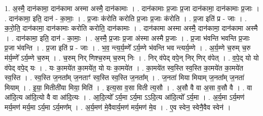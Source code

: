 \documentclass[17pt]{extarticle}
\begin{document}
1. अ॒स्मै॒ दान॑कामा॒ दान॑कामा अस्मा अस्मै॒ दान॑कामाः । . दान॑कामाः प्र॒जाः प्र॒जा दान॑कामा॒ दान॑कामाः प्र॒जाः । . दान॑कामा॒ इति॒ दान॑ - का॒माः॒ । . प्र॒जाः क॑रोति करोति प्र॒जाः प्र॒जाः क॑रोति । . प्र॒जा इति॑ प्र - जाः । . क॒रो॒ति॒ दान॑कामा॒ दान॑कामाः करोति करोति॒ दान॑कामाः । . दान॑कामा अस्मा अस्मै॒ दान॑कामा॒ दान॑कामा अस्मै । . दान॑कामा॒ इति॒ दान॑ - का॒माः॒ । . अ॒स्मै॒ प्र॒जाः प्र॒जा अ॑स्मा अस्मै प्र॒जाः । . प्र॒जा भ॑वन्ति भवन्ति प्र॒जाः प्र॒जा भ॑वन्ति । . प्र॒जा इति॑ प्र - जाः । . भ॒व॒ न्त्य॒र्य॒म्णे᳚ ऽर्य॒म्णे भ॑वन्ति भव न्त्यर्य॒म्णे । . अ॒र्य॒म्णे च॒रुम् च॒रु म॑र्य॒म्णे᳚ ऽर्य॒म्णे च॒रुम् । . च॒रुम् निर् णिश्च॒रुम् च॒रुम् निः । . निर् व॑पेद् वपे॒न् निर् णिर् व॑पेत् । . व॒पे॒द् यो यो व॑पेद् वपे॒द् यः । . यः का॒मये॑त का॒मये॑त॒ यो यः का॒मये॑त । . का॒मये॑त स्व॒स्ति स्व॒स्ति का॒मये॑त का॒मये॑त स्व॒स्ति । . स्व॒स्ति ज॒नता᳚म् ज॒नताꣳ॑ स्व॒स्ति स्व॒स्ति ज॒नता᳚म् । . ज॒नता॑ मिया मियाम् ज॒नता᳚म् ज॒नता॑ मियाम् । . इ॒या॒ मितीती॑या मिया॒ मिति॑ । . इत्य॒सा व॒सा विती त्य॒सौ । . अ॒सौ वै वा अ॒सा व॒सौ वै । . वा आ॑दि॒त्य आ॑दि॒त्यो वै वा आ॑दि॒त्यः । . आ॒दि॒त्यो᳚ ऽर्य॒मा ऽर्य॒मा ऽऽदि॒त्य आ॑दि॒त्यो᳚ ऽर्य॒मा । . अ॒र्य॒मा ऽर्य॒मण॑ मर्य॒मण॑ मर्य॒मा ऽर्य॒मा ऽर्य॒मण᳚म् । . अ॒र्य॒मण॑ मे॒वैवार्य॒मण॑ मर्य॒मण॑ मे॒व । . ए॒व स्वेन॒ स्वेनै॒वैव स्वेन॑ । \newline
\end{document}
